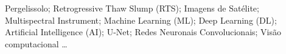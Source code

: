 \begin{keywords}
Pergelissolo; Retrogressive Thaw Slump (RTS); Imagens de Satélite; Multispectral Instrument; Machine Learning (ML); Deep Learning (DL); Artificial Intelligence (AI); U-Net; Redes Neuronais Convolucionais; Visão computacional \ldots
\end{keywords}

%
%
